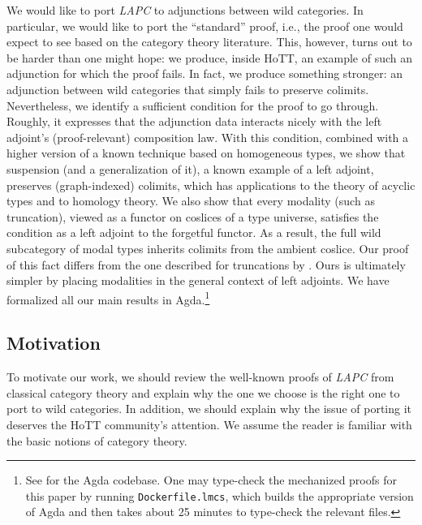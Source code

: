 \documentclass{lmcs}
\theoremstyle{definition}\newtheorem{note}[thm]{Note}
\begin{document}
We would like to port \emph{LAPC} to adjunctions between wild categories. In particular, we would like to port the ``standard'' proof, i.e., the proof one would expect to see based on the category theory literature. This, however, turns out to be harder than one might hope: we produce, inside HoTT, an example of such an adjunction for which the proof fails. In fact, we produce something stronger: an adjunction between wild categories that simply fails to preserve colimits. Nevertheless, we identify a sufficient condition for the proof to go through. Roughly, it expresses that the adjunction data interacts nicely with the left adjoint's (proof-relevant) composition law. With this condition, combined with a higher version of a known technique based on homogeneous types, we show that suspension (and a generalization of it), a known example of a left adjoint, preserves (graph-indexed) colimits, which has applications to the theory of acyclic types and to homology theory. We also show that every modality (such as truncation), viewed as a functor on coslices of a type universe, satisfies the condition as a left adjoint to the forgetful functor. As a result, the full wild subcategory of modal types inherits colimits from the ambient coslice. Our proof of this fact differs from the one described for truncations by \cite[Section 7.4]{Uni13}. Ours is ultimately simpler by placing modalities in the general context of left adjoints. We have formalized all our main results in Agda.\footnote{See \cite{2cohagda-pub} for the Agda codebase. One may type-check the mechanized proofs for this paper by running \texttt{Dockerfile.lmcs}, which builds the appropriate version of Agda and then takes about 25 minutes to type-check the relevant files.} 

\subsection{Motivation}

To motivate our work, we should review the well-known proofs of \emph{LAPC} from classical category theory and explain why the one we choose is the right one to port to wild categories. In addition, we should explain why the issue of porting it deserves the HoTT community's attention. We assume the reader is familiar with the basic notions of category theory.
\end{document}
